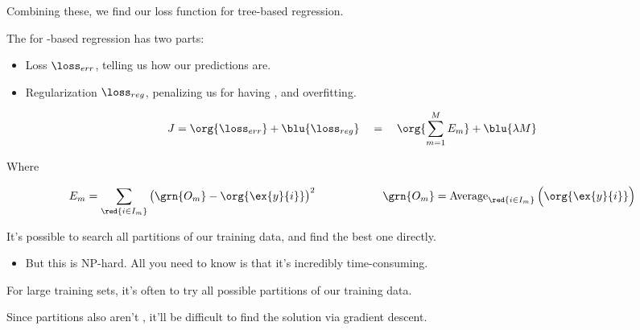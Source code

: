         Combining these, we find our loss function for tree-based regression.\\

        \begin{kequation}
            The  for -based regression has two parts:

            \begin{itemize}
                \item Loss $\loss_{err}$, telling us how  our predictions are.
                \item Regularization $\loss_{reg}$, penalizing us for having , and overfitting.
            \end{itemize}

            \begin{equation*}
                J = \org{\loss_{err}}+\blu{\loss_{reg}} \quad = \quad \org{\sum_{m=1}^M E_m} + \blu{\lambda M}
            \end{equation*}

            Where

            \begin{equation*}
                E_m = \sum_{\red{i \in I_m}} \big( \grn{O_m} - \org{\ex{y}{i}} \big)^2
                \qquad \qquad \qquad
                \grn{O_m} = 
                \operatorname{Average}_{\red{i \in I_m}} \Big( \org{\ex{y}{i}} \Big) 
            \end{equation*}
            
        \end{kequation}

        It's possible to search all partitions of our training data, and find the best one directly.

        \begin{itemize}
            \item But this is NP-hard. All you need to know is that it's incredibly time-consuming.\\
        \end{itemize}

        \begin{concept}
            For large training sets, it's often  to try all possible partitions of our training data.

            Since partitions also aren't , it'll be difficult to find the  solution via gradient descent.
        \end{concept}


